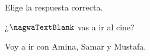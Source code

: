
\begin{question}

\begin{instance}
  
\begin{mcq}[standalone=false]
    
\begin{stem}
      Elige la respuesta correcta.\par      
\begin{enumerationnolabel}
        \item{¿$\nagwaTextBlank$ vas a ir al cine?}        
        \item{Voy a ir con Amina, Samar y Mustafa.}      
\end{enumerationnolabel}
    
\end{stem}
    
\begin{distractors}
\end{distractors}
              
\end{mcq}

\end{instance}

\end{question}
